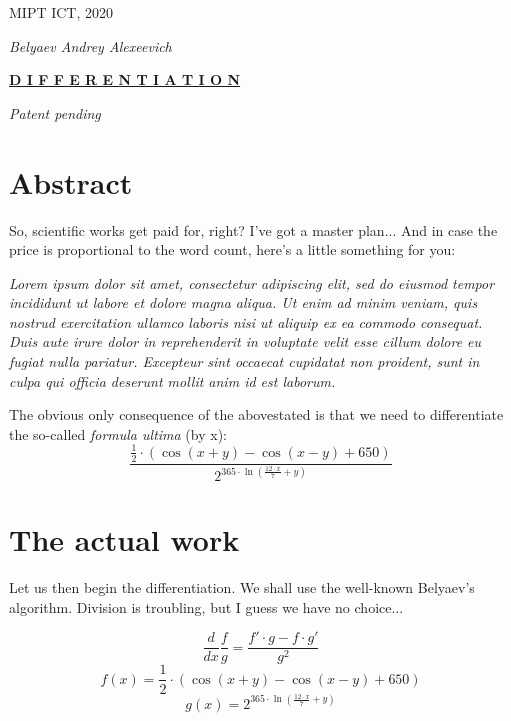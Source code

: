 \documentclass[12pt]{article}
\begin{document}
\begin{titlepage}\begin{center}\Large MIPT ICT, 2020\end{center}\begin{center}\Large\textit{Belyaev Andrey Alexeevich}\end{center}\begin{center}\Huge\textbf{\underline{D I F F E R E N T I A T I O N}}\end{center}\begin{center}\large\textit{Patent pending}\end{center}\section{\Large{Abstract}}
So, scientific works get paid for, right? I've got a master plan... 
And in case the price is proportional to the word count, here's a little something for you:\par
\textit{Lorem ipsum dolor sit amet, consectetur adipiscing elit, sed do eiusmod tempor incididunt ut labore et dolore magna aliqua. Ut enim ad minim veniam, quis nostrud exercitation ullamco laboris nisi ut aliquip ex ea commodo consequat. Duis aute irure dolor in reprehenderit in voluptate velit esse cillum dolore eu fugiat nulla pariatur. Excepteur sint occaecat cupidatat non proident, sunt in culpa qui officia deserunt mollit anim id est laborum.}\par
The obvious only consequence of the abovestated is that we need to differentiate the so-called \textit{formula ultima} (by x): 
$$ \frac{\frac{ 1 }{ 2 } \cdot \left(\cos \left( x  +  y \right) - \cos \left( x  -  y \right) +  650 \right)}{ 2 ^{ 365  \cdot \ln \left(\frac{ 12  \cdot  x }{ 7 } +  y \right)}} $$

\end{titlepage}

\section{\Large{The actual work}}

Let us then begin the differentiation. We shall use the well-known Belyaev's algorithm.
Division is troubling, but I guess we have no choice...

$$ \frac{d}{dx} \frac{f}{g} = \frac{f' \cdot g - f \cdot g'}{g^2} $$
$$ f(x) = \frac{ 1 }{ 2 } \cdot \left(\cos \left( x  +  y \right) - \cos \left( x  -  y \right) +  650 \right) $$
$$ g(x) =  2 ^{ 365  \cdot \ln \left(\frac{ 12  \cdot  x }{ 7 } +  y \right)} $$
\end{document}
